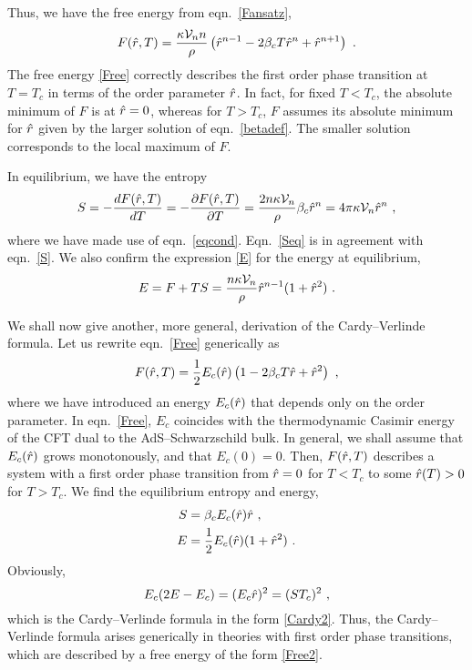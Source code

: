 \documentclass[a4paper,12pt]{article}
\begin{document}
Thus, we have the free energy from eqn.\ \eqref{Fansatz},
\begin{equation}
\label{Free}
  F(\hat{r},T) = \frac{\kappa\mathcal{V}_n n}{\rho} \left( \hat{r}^{n-1} -2 \beta_c T
  \hat{r}^n + \hat{r}^{n+1} \right)~.
\end{equation}
The free energy \eqref{Free} correctly describes the first order phase
transition at $T=T_c$ in terms of the order parameter $\hat{r}$. In fact,
for fixed $T<T_c$, the absolute minimum of $F$ is at $\hat{r}=0$, whereas
for $T>T_c$, $F$ assumes its absolute minimum for $\hat{r}$ given by the
larger solution of eqn.\ \eqref{betadef}. The smaller solution
corresponds to the local maximum of $F$.

In equilibrium, we have the entropy
\begin{equation}
\label{Seq}
  S = - \frac{dF(\hat{r},T)}{dT} = - \frac{\partial F(\hat{r},T)}{\partial T}
  = \frac {2n \kappa \mathcal{V}_n}{\rho} \beta_c \hat{r}^n = 4\pi\kappa \mathcal{V}_n \hat{r}^n~,
\end{equation}
where we have made use of eqn.\ \eqref{eqcond}. Eqn.\ \eqref{Seq} is
in agreement with eqn.\ \eqref{S}. We also confirm the expression
\eqref{E} for the energy at equilibrium,
\begin{equation}
\label{Eeq}
  E = F + TS = \frac{n \kappa \mathcal{V}_n}{\rho} \hat{r}^{n-1} (1+\hat{r}^2)~.
\end{equation}

We shall now give another, more general, derivation of the
Cardy--Verlinde formula. Let us rewrite eqn.\ \eqref{Free}
generically as
\begin{equation}
\label{Free2}
  F(\hat{r},T) = \frac12 E_c(\hat{r}) \left( 1 -2 \beta_c T \hat{r} + \hat{r}^2
  \right)~,
\end{equation}
where we have introduced an energy $E_c(\hat{r})$ that depends only on the
order parameter. In eqn.\ \eqref{Free}, $E_c$ coincides with the
thermodynamic Casimir energy of the CFT dual to the
AdS--Schwarzschild bulk. In general,
we shall assume that $E_c(\hat{r})$ grows monotonously, and that
$E_c(0)=0$.  Then, $F(\hat{r},T)$ describes a system with a first order phase
transition from $\hat{r}=0$ for $T<T_c$ to some $\hat{r}(T)>0$ for $T>T_c$.
We find the equilibrium entropy and energy,
\begin{align}
\label{Seq2}
  S &= \beta_c E_c(\hat{r}) \hat{r}~,\\
\label{Eeq2}
  E &= \frac12 E_c(\hat{r}) (1+\hat{r}^2)~.
\end{align}
Obviously,
\begin{equation}
\label{Cardy3}
  E_c (2E-E_c) = (E_c \hat{r})^2 = (ST_c)^2~,
\end{equation}
which is the Cardy--Verlinde formula in the form \eqref{Cardy2}.
Thus, the Cardy--Verlinde formula arises generically in theories with
first order phase transitions, which are described by a free energy
of the form \eqref{Free2}.
\end{document}
